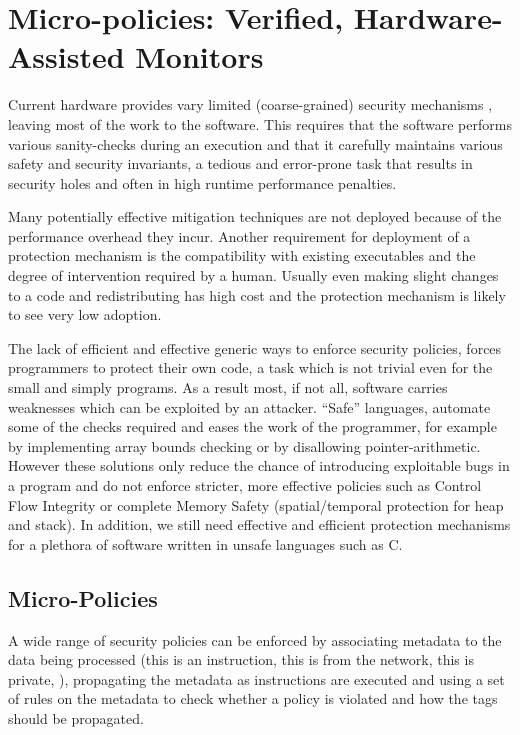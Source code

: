 \chapter{Micro-policies: Verified, Hardware-Assisted Monitors}\label{ch:policies}
Current hardware provides vary limited (coarse-grained)
security mechanisms ,
leaving most of the work to the software. This requires that the software
performs various sanity-checks during an execution and that it carefully
maintains various safety and security invariants, a tedious and error-prone task
that results in security holes and often in high runtime performance penalties.

Many potentially effective mitigation techniques are not deployed because of the
performance overhead they incur. Another requirement for deployment of a
protection mechanism is the compatibility with existing executables and
the degree of intervention required by a human.
Usually even making slight changes to a code and redistributing has high cost
and the protection mechanism is likely to see very low adoption.

The lack of efficient and effective generic ways to enforce security policies,
forces programmers to protect their own code, a task which is not trivial even
for the small and simply programs. As a result most, if not all, software
carries weaknesses which can be exploited by an attacker. ``Safe'' languages,
automate some of the checks required and eases the work of the programmer,
for example by implementing array bounds checking or by disallowing
pointer-arithmetic. However these solutions only reduce the chance of
introducing exploitable bugs in a program and do not enforce stricter,
more effective policies such as Control Flow Integrity
or complete Memory Safety (spatial/temporal protection for heap and stack).
In addition, we still need effective and efficient protection mechanisms for a
plethora of software written in unsafe languages such as C.

\section{Micro-Policies}\label{sec:micropolicies}

A wide range of security policies can be enforced by associating metadata
to the data being processed (\EG this is an instruction, this is from the
network, this is private, \ETC), propagating the metadata as
instructions are executed and using a set of rules on the metadata to check
whether a policy is violated and how the tags should be propagated.

